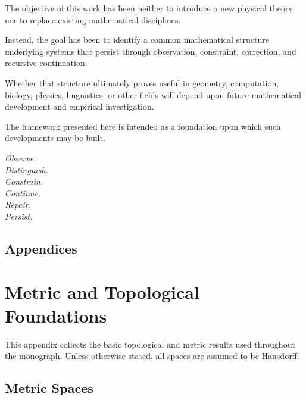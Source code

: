 \documentclass[11pt]{book}
\numberwithin{equation}{chapter}
\theoremstyle{definition}
\theoremstyle{plain}
\begin{document}
The objective of this work has been neither to introduce a new physical
theory nor to replace existing mathematical disciplines.

Instead, the goal has been to identify a common mathematical structure
underlying systems that persist through observation, constraint,
correction, and recursive continuation.

Whether that structure ultimately proves useful in geometry,
computation, biology, physics, linguistics, or other fields will depend
upon future mathematical development and empirical investigation.

The framework presented here is intended as a foundation upon which
such developments may be built.

\bigskip

\begin{center}

\emph{Observe.\\
Distinguish.\\
Constrain.\\
Continue.\\
Repair.\\
Persist.}

\end{center}


\newpage 
\section*{Appendices}

\appendix

\chapter{Metric and Topological Foundations}

This appendix collects the basic topological and metric results used
throughout the monograph. Unless otherwise stated, all spaces are
assumed to be Hausdorff.


\section{Metric Spaces}
\end{document}

